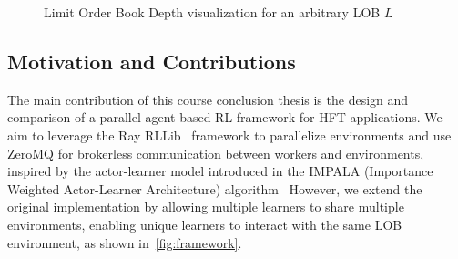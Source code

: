 \begin{figure}[H]
    \centering
    \caption{Limit Order Book Depth visualization for an arbitrary LOB $L$}
    \label{fig:lob}
\end{figure}

\subsection{Motivation and Contributions}

The main contribution of this course conclusion thesis is the design and comparison of a parallel agent-based RL framework for HFT applications.
We aim to leverage the Ray RLLib~\cite{liang2018rllib} framework to parallelize environments and use ZeroMQ for brokerless communication between workers and environments,
inspired by the actor-learner model introduced in the IMPALA (Importance Weighted Actor-Learner Architecture) algorithm~\cite{espeholt2018impala}
However, we extend the original implementation by allowing multiple learners to share multiple environments,
enabling unique learners to interact with the same LOB environment, as shown in~\autoref{fig:framework}.

